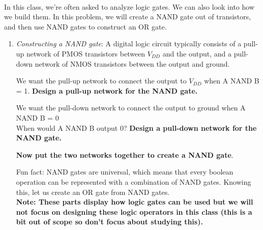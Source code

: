 
 \\
In this class, we're often asked to analyze logic gates. We can also look into how we build them. In this problem, we will create a NAND gate out of transistors, and then use NAND gates to construct an OR gate.
\begin{enumerate}
    \item \textit{Constructing a NAND gate}: A digital logic circuit typically consists of a pull-up network of PMOS transistors between $V_{DD}$ and the output, and a pull-down network of NMOS transistors between the output and ground. 
    \begin{enumerate}
        \qitem We want the pull-up network to connect the output to $V_{DD}$ when A NAND B = 1.
        \textbf{Design a pull-up network for the NAND gate.} \\
        \sol{
        
        }

        \ws{\vspace{120px}}

        \qitem We want the pull-down network to connect the output to ground when A NAND B = 0 \\
        When would A NAND B output 0? \textbf{Design a pull-down network for the NAND gate.} \\

        \ws{\vspace{120px}}

        \qitem \textbf{Now put the two networks together to create a NAND gate}. \\
        \sol{}

        \ws{\vspace{180px}}

    \end{enumerate}
    Fun fact: NAND gates are universal, which means that every boolean operation can be represented with a combination of NAND gates. Knowing this, let us create an OR gate from NAND gates. \\

    \textbf{Note: These parts display how logic gates can be used but we will not focus on designing these logic operators in this class (this is a bit out of scope so don’t focus about studying this).}


\end{enumerate}
